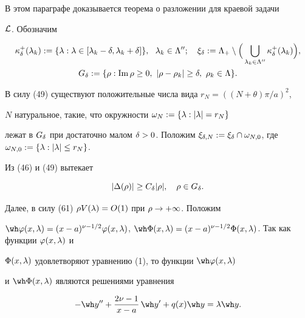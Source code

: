 В этом параграфе доказывается теорема о разложении для краевой задачи


${\cal L}$. Обозначим


\begin{gather*}


\kappa_{\de}^{+}(\la_k):=\{\la: \la\in[\la_k-\de, \la_k+\de]\},\ \


\la_k\in\Lambda'';\quad \xi_{\de}:=\Lambda_{+}\setminus


\Big( \bigcup_{\la_k\in\Lambda''} \kappa_{\de}^{+}(\la_k)\Big), \\


%


G_{\de}:=\{\rho:\im\rho\ge 0,\ |\rho-\rho_k|\ge\de,


\ \rho_k\in\Lambda\}.


\end{gather*}


В силу (49) существуют положительные числа вида $r_N=((N+\theta)\pi/a)^2$,


$N$ натуральное, такие, что окружности $\omega_N:=\{\lambda: |\lambda|=r_N\}$


лежат в $G_{\de}$ при достаточно малом $\de>0$. Положим $\xi_{\de,N}:=


\xi_{\de}\cap\om_{N,0}$, где $\om_{N,0}:=\{\la: |\la|\le r_N\}$.


Из (46) и (49) вытекает


\begin{equation}


|\Delta(\rho)|\ge C_\de |\rho|,\quad \rho\in G_{\de}.


\end{equation}


Далее, в силу (61) $\rho V(\lambda)=O(1)$ при $\rho\to +\infty$. Положим


$\wh\vv(x,\la)=(x-a)^{\nu-1/2}\vv(x,\la)$, $\wh\Phi(x,\la)=


(x-a)^{\nu-1/2}\Phi(x,\la)$. Так как функции $\vv(x,\la)$ и


$\Phi(x,\lambda)$ удовлетворяют уравнению (1), то функции $\wh\vv(x,\la)$


и $\wh\Phi(x,\la)$ являются решениями уравнения


\begin{equation}


-\wh y''+ \frac{2\nu-1}{x-a}\,\wh y'+q(x)\wh y =\la\wh y.


\end{equation}






